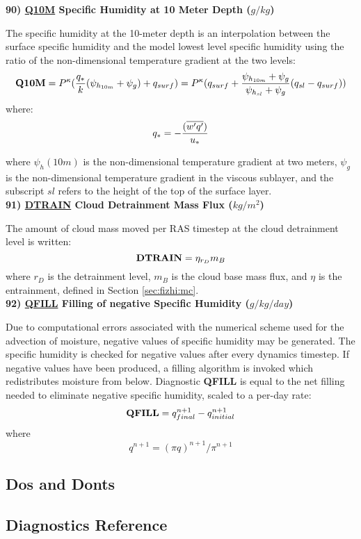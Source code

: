 \noindent
{\bf 90)  \underline {Q10M}  Specific Humidity at 10 Meter Depth ($g/kg$) }

\noindent
The specific humidity at the 10-meter depth is an interpolation between the surface specific 
humidity and the model lowest level specific humidity using the ratio of the 
non-dimensional temperature gradient at the two levels:
\[
{\bf Q10M} = P^{\kappa} ({q_* \over k} ({\psi_{h_{10m}}+\psi_g}) + q_{surf} ) = 
P^{\kappa}(q_{surf} + { {\psi_{h_{10m}}+\psi_g} \over {{\psi_{h_{sl}}+\psi_g}} }
(q_{sl} - q_{surf})) 
\]
where:
\[
q_* =  - { (\overline{w^{\prime}q^{\prime}}) \over {u_*} }
\]

\noindent
where $\psi_h(10m)$ is the non-dimensional temperature gradient at two meters, $\psi_g$ is
the non-dimensional temperature gradient in the viscous sublayer, and the subscript
$sl$ refers to the height of the top of the surface layer.
\\
 
\noindent
{\bf 91)  \underline {DTRAIN} Cloud Detrainment Mass Flux ($kg/m^2$) } 

The amount of cloud mass moved per RAS timestep at the cloud detrainment level is written:
\[
{\bf DTRAIN} = \eta_{r_D}m_B
\]
\noindent
where $r_D$ is the detrainment level, 
$m_B$ is the cloud base mass flux, and $\eta$
is the entrainment, defined in Section \ref{sec:fizhi:mc}.
\\

\noindent
{\bf 92)  \underline {QFILL}  Filling of negative Specific Humidity ($g/kg/day$) }

\noindent
Due to computational errors associated with the numerical scheme used for
the advection of moisture, negative values of specific humidity may be generated.  The
specific humidity is checked for negative values after every dynamics timestep.  If negative
values have been produced, a filling algorithm is invoked which redistributes moisture from
below.  Diagnostic {\bf QFILL} is equal to the net filling needed
to eliminate negative specific humidity, scaled to a per-day rate:
\[
{\bf QFILL} = q^{n+1}_{final} - q^{n+1}_{initial}
\]
where
\[
q^{n+1} = (\pi q)^{n+1} / \pi^{n+1}
\]

\subsection{Dos and Donts}

\subsection{Diagnostics Reference}

